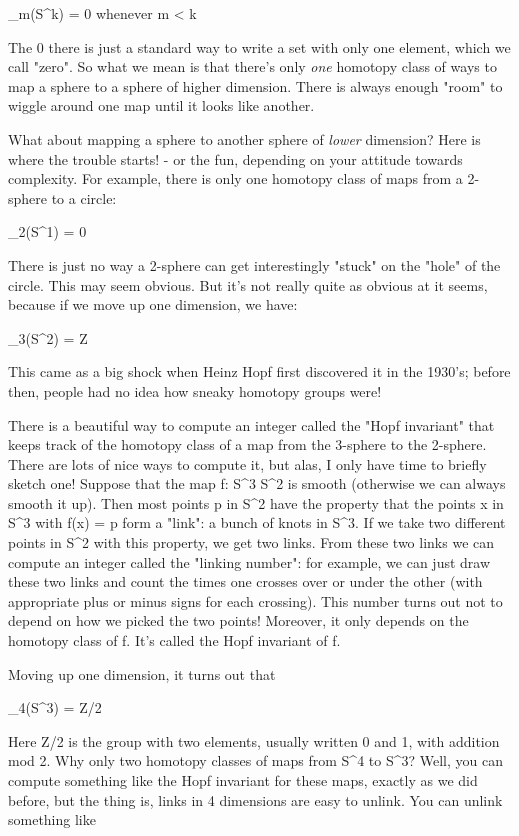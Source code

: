 \pi _{m}(S^{k}) = {0}                whenever m < k

The {0} there is just a standard way to write a set with only one
element, which we call "zero".  So what we mean is that there's only
\emph{one} homotopy class of ways to map a sphere to a sphere of higher
dimension.  There is always enough "room" to wiggle around one map until
it looks like another.

What about mapping a sphere to another sphere of \emph{lower} dimension?
Here is where the trouble starts! - or the fun, depending on your
attitude towards complexity.   For example, there is only one homotopy
class of maps from a 2-sphere to a circle:

\pi _{2}(S^{1}) = {0}

There is just no way a 2-sphere can get interestingly "stuck" on the
"hole" of the circle.  This may seem obvious.  But it's not 
really quite as obvious at it seems, because if we move up one dimension, 
we have:

\pi _{3}(S^{2}) = Z

This came as a big shock when Heinz Hopf first discovered it in the
1930's; before then, people had no idea how sneaky homotopy groups were!

There is a beautiful way to compute an integer called the "Hopf 
invariant"
that keeps track of the homotopy class of a map from the 3-sphere to the
2-sphere.  There are lots of nice ways to compute it, but alas, I only
have time to briefly sketch one!  Suppose that the map f: S^{3} \to S^{2} is
smooth (otherwise we can always smooth it up).  Then most points p in
S^{2} have the property that the points x in S^{3} with f(x) = p form a
"link": a bunch of knots in S^{3}.  If we take two different points in S^{2}
with this property, we get two links.  From these two links we can
compute an integer called the "linking number":
for example, we can just
draw these two links and count the times one crosses over or under the 
other (with appropriate plus or minus signs for each crossing).  This number
turns out not to depend on how we picked the two points!  Moreover, it
only depends on the homotopy class of f.  It's called the Hopf invariant
of f.

Moving up one dimension, it turns out that

\pi _{4}(S^{3}) = Z/2

Here Z/2 is the group with two elements, usually written 0 and 1,
with addition mod 2.  Why only two homotopy classes of maps from
S^{4} to S^{3}?  Well, you can compute something like the Hopf invariant
for these maps, exactly as we did before, but the thing is, links
in 4 dimensions are easy to unlink.  You can unlink something like


